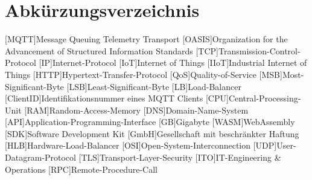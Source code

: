 

\section*{Abkürzungsverzeichnis}
\begin{acronym}[xxxxxxxxxx] %
    [MQTT]{Message Queuing Telemetry Transport}
    [OASIS]{Organization for the Advancement of Structured Information Standards}
    [TCP]{Transmission-Control-Protocol}
    [IP]{Internet-Protocol}
    [IoT]{Internet of Things}
    [IIoT]{Industrial Internet of Things}
    [HTTP]{Hypertext-Transfer-Protocol}
    [QoS]{Quality-of-Service}
    [MSB]{Most-Significant-Byte}
    [LSB]{Least-Significant-Byte}
    [LB]{Load-Balancer}
    [ClientID]{Identifikationsnummer eines MQTT Clients}
    [CPU]{Central-Processing-Unit}
    [RAM]{Random-Access-Memory}
    [DNS]{Domain-Name-System}
    [API]{Application-Programming-Interface}
    [GB]{Gigabyte}
    [WASM]{WebAssembly}
    [SDK]{Software Development Kit}
    [GmbH]{Gesellschaft mit beschränkter Haftung}
    [HLB]{Hardware-Load-Balancer}
    [OSI]{Open-System-Interconnection}
    [UDP]{User-Datagram-Protocol}
    [TLS]{Transport-Layer-Security}
    [ITO]{IT-Engineering \& Operations}
    [RPC]{Remote-Procedure-Call}
\end{acronym}
\newpage
